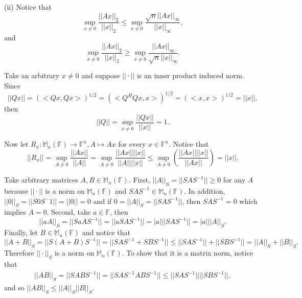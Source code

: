 \documentclass[letterpaper,12pt]{article}
\theoremstyle{definition}
\newenvironment{problem}[2][Problem]{\begin{trivlist}
\item[\hskip \labelsep {\bfseries #1}\hskip \labelsep {\bfseries #2.}]}{\end{trivlist}}
\begin{document}
\begin{problem}{28}
(ii)
Notice that
\begin{equation*}
    \sup_{x\neq 0}\frac{||Ax||_2}{||x||_2}\leq
    \sup_{x\neq 0}\frac{\sqrt{n}||Ax||_\infty}{||x||_\infty},
\end{equation*}
and
\begin{equation*}
    \sup_{x\neq 0}\frac{||Ax||_2}{||x||_2}\geq
    \sup_{x\neq 0}\frac{||Ax||_\infty}{\sqrt{n}||x||_\infty}.
\end{equation*}

\end{problem} \begin{problem}{29}
Take an arbitrary $x\neq 0$ and suppose $||\cdot||$ is an inner product induced norm.
Since
\begin{equation*}
    ||Qx||=\left(<Qx,Qx>\right)^{1/2}=
    \left(<Q^HQx,x>\right)^{1/2}=
    \left(<x,x>\right)^{1/2}=
    ||x||,
\end{equation*}
then
\begin{equation*}
    ||Q||=\sup_{x\neq 0}\frac{||Qx||}{||x||}=1.
\end{equation*}

Now let $R_x:\mathbb M_n(\mathbb F)\to\mathbb F^n, A\mapsto Ax$ for every $x\in\mathbb F^n$.
Notice that
\begin{equation*}
    ||R_x||=\sup_{A\neq 0}\frac{||Ax||}{||A||}=
    \sup_{A\neq 0}\frac{||Ax||||x||}{||A||||x||}\leq
    \sup_{A\neq 0}\left(\frac{||Ax||||x||}{||Ax||}\right)=
    ||x||.
\end{equation*}


\end{problem} \begin{problem}{30}
Take arbitrary matrices $A,B\in\mathbb M_n(\mathbb F)$.
First, $||A||_S=||SAS^{-1}||\geq 0$ for any $A$ because
$||\cdot||$ is a norm on $\mathbb M_n(\mathbb F)$ and
$SAS^{-1}\in\mathbb M_n(\mathbb F)$.
In addition, $||0||_S=||S0S^-1||=||0||=0$ and if
$0=||A||_S=||SAS^{-1}||$, then $SAS^{-1}=0$ which implies $A=0$.
Second, take $a\in\mathbb F$, then
\begin{equation*}
    ||aA||_S=||SaAS^{-1}||=
    ||aSAS^{-1}||=|a|||SAS^{-1}||=
    |a|||A||_S.
\end{equation*}
Finally, let $B\in\mathbb M_n(\mathbb F)$ and notice that
\begin{equation*}
    ||A+B||_S=||S(A+B)S^{-1}||=
    ||SAS^{-1}+SBS^{-1}||\leq||SAS^{-1}||+||SBS^{-1}||=
    ||A||_S+||B||_S.
\end{equation*}
Therefore $||\cdot||_S$ is a norm on $\mathbb M_n(\mathbb F)$.
To show that it is a matrix norm, notice that
\begin{align*}
    ||AB||_S=||SABS^{-1}||=
    ||SAS^{-1}ABS^{-1}||\leq
    ||SAS^{-1}||||SBS^{-1}||,
\end{align*}
and so $||AB||_S\leq||A||_S||B||_S$.

\end{problem}
\end{document}
